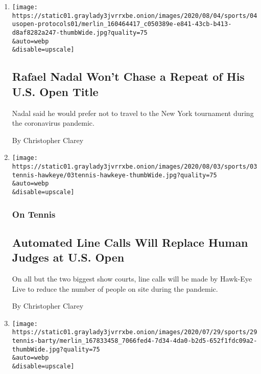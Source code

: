 \begin{enumerate}
\def\labelenumi{\arabic{enumi}.}
\item
  \href{/2020/08/04/sports/tennis/rafael-nadal-us-open.html}{}

  \texttt{[image: https://static01.graylady3jvrrxbe.onion/images/2020/08/04/sports/04usopen-protocols01/merlin\_160464417\_c050389e-e841-43cb-b413-d8af8282a247-thumbWide.jpg?quality=75\\\&auto=webp\\\&disable=upscale]}

  \hypertarget{rafael-nadal-wont-chase-a-repeat-of-his-us-open-title}{%
  \subsection{Rafael Nadal Won't Chase a Repeat of His U.S. Open
  Title}\label{rafael-nadal-wont-chase-a-repeat-of-his-us-open-title}}

  Nadal said he would prefer not to travel to the New York tournament
  during the coronavirus pandemic.

  By Christopher Clarey
\item
  \href{/2020/08/03/sports/tennis/us-open-hawkeye-line-judges.html}{}

  \texttt{[image: https://static01.graylady3jvrrxbe.onion/images/2020/08/03/sports/03tennis-hawkeye/03tennis-hawkeye-thumbWide.jpg?quality=75\\\&auto=webp\\\&disable=upscale]}

  \hypertarget{on-tennis}{%
  \subsubsection{On Tennis}\label{on-tennis}}

  \hypertarget{automated-line-calls-will-replace-human-judges-at-us-open}{%
  \subsection{Automated Line Calls Will Replace Human Judges at U.S.
  Open}\label{automated-line-calls-will-replace-human-judges-at-us-open}}

  On all but the two biggest show courts, line calls will be made by
  Hawk-Eye Live to reduce the number of people on site during the
  pandemic.

  By Christopher Clarey
\item
  \href{/2020/07/29/sports/tennis/ashleigh-barty-us-open.html}{}

  \texttt{[image: https://static01.graylady3jvrrxbe.onion/images/2020/07/29/sports/29tennis-barty/merlin\_167833458\_7066fed4-7d34-4da0-b2d5-652f1fdc09a2-thumbWide.jpg?quality=75\\\&auto=webp\\\&disable=upscale]}


\end{enumerate}
